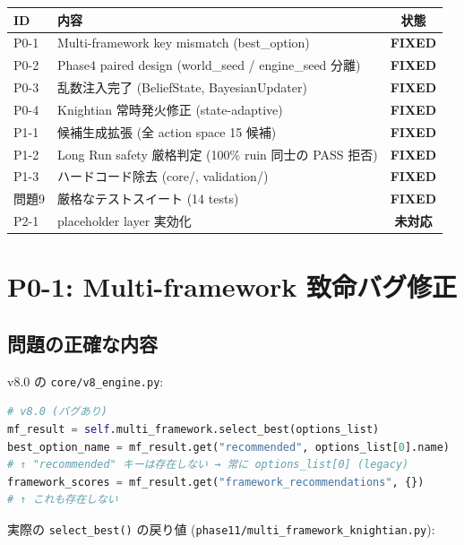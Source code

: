 \documentclass[a4paper,11pt]{report}
\begin{document}
\begin{longtable}{l p{8cm} c}
\toprule
ID & 内容 & 状態 \\
\midrule
P0-1 & Multi-framework key mismatch (best\_option) & \textcolor{success}{\textbf{FIXED}} \\
P0-2 & Phase4 paired design (world\_seed / engine\_seed 分離) & \textcolor{success}{\textbf{FIXED}} \\
P0-3 & 乱数注入完了 (BeliefState, BayesianUpdater) & \textcolor{success}{\textbf{FIXED}} \\
P0-4 & Knightian 常時発火修正 (state-adaptive) & \textcolor{success}{\textbf{FIXED}} \\
P1-1 & 候補生成拡張 (全 action space 15 候補) & \textcolor{success}{\textbf{FIXED}} \\
P1-2 & Long Run safety 厳格判定 (100\% ruin 同士の PASS 拒否) & \textcolor{success}{\textbf{FIXED}} \\
P1-3 & ハードコード除去 (core/, validation/) & \textcolor{success}{\textbf{FIXED}} \\
問題9 & 厳格なテストスイート (14 tests) & \textcolor{success}{\textbf{FIXED}} \\
P2-1 & placeholder layer 実効化 & \textcolor{warning}{\textbf{未対応}} \\
\bottomrule
\end{longtable}

\chapter{P0-1: Multi-framework 致命バグ修正}

\section{問題の正確な内容}

v8.0 の \texttt{core/v8\_engine.py}:

\begin{lstlisting}[language=Python]
# v8.0 (バグあり)
mf_result = self.multi_framework.select_best(options_list)
best_option_name = mf_result.get("recommended", options_list[0].name)
# ↑ "recommended" キーは存在しない → 常に options_list[0] (legacy)
framework_scores = mf_result.get("framework_recommendations", {})
# ↑ これも存在しない
\end{lstlisting}

実際の \texttt{select\_best()} の戻り値 (\texttt{phase11/multi\_framework\_knightian.py}):
\end{document}
